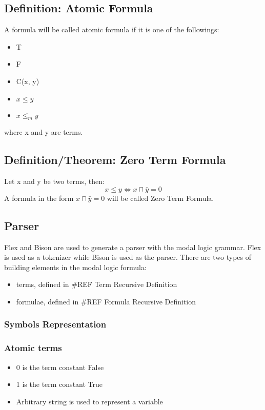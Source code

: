 \documentclass{article}
\begin{document}
	\subsection{Definition: Atomic Formula}
		A formula will be called atomic formula if it is one of the followings:
		\begin{itemize}
			\item T
			\item F
			\item C(x, y)
			\item $x \le y$
			\item $x \le_m y$
		\end{itemize}
		where x and y are terms.
	
	\subsection{Definition/Theorem: Zero Term Formula}
		Let x and y be two terms, then:
		\begin{equation}
			x \le y  \iff x \sqcap \bar{y} = 0
		\end{equation}
		A formula in the form $x \sqcap \bar{y} = 0$ will be called Zero Term Formula.


	\subsection{Parser}
		Flex and Bison are used to generate a parser with the modal logic grammar.
		Flex is used as a tokenizer while Bison is used as the parser.
		\newline
		There are two types of building elements in the modal logic formula:
		\begin{itemize}
			\item terms, defined in \#REF Term Recursive Definition
			\item formulae, defined in \#REF Formula Recursive Definition
		\end{itemize}
		
	\subsubsection{Symbols Representation}
		\subsubsection*{Atomic terms}
		\begin{itemize}
			\item 0 is the term constant False
			\item 1 is the term constant True
			\item Arbitrary string is used to represent a variable
		\end{itemize}
		
\end{document}
